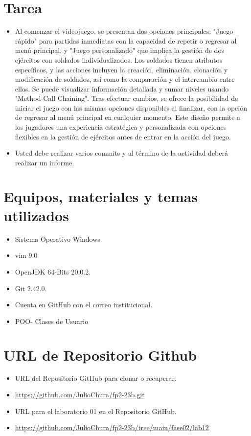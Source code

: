 \documentclass{article}
\begin{document}
	\section{Tarea}
	\begin{itemize}		
		\item Al comenzar el videojuego, se presentan dos opciones principales: "Juego rápido" para partidas inmediatas con la capacidad de repetir o regresar al menú principal, y "Juego personalizado" que implica la gestión de dos ejércitos con soldados individualizados. Los soldados tienen atributos específicos, y las acciones incluyen la creación, eliminación, clonación y modificación de soldados, así como la comparación y el intercambio entre ellos. Se puede visualizar información detallada y sumar niveles usando "Method-Call Chaining". Tras efectuar cambios, se ofrece la posibilidad de iniciar el juego con las mismas opciones disponibles al finalizar, con la opción de regresar al menú principal en cualquier momento. Este diseño permite a los jugadores una experiencia estratégica y personalizada con opciones flexibles en la gestión de ejércitos antes de entrar en la acción del juego.
		\item Usted debe realizar varios commits y al término de la actividad deberá realizar un informe.
		
	\end{itemize}
	
	\section{Equipos, materiales y temas utilizados}
	\begin{itemize}
		\item Sistema Operativo Windows
		\item vim 9.0
		\item OpenJDK 64-Bits 20.0.2.
		\item Git 2.42.0.
		\item Cuenta en GitHub con el correo institucional.
		\item POO- Clases de Usuario
	\end{itemize}
	
	\section{URL de Repositorio Github}
	\begin{itemize}
		\item URL del Repositorio GitHub para clonar o recuperar.
		\item \url{https://github.com/JulioChura/fp2-23b.git}
		\item URL para el laboratorio 01 en el Repositorio GitHub.
		\item \url{https://github.com/JulioChura/fp2-23b/tree/main/fase02/lab12}
	\end{itemize}
	
\end{document}

